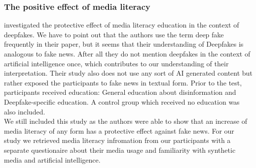 \documentclass[
  a4paper,  %
  twoside,  %
  bibliography=totoc,
  headsepline,
  cleardoublepage=empty,
  parskip=half,
  draft=false
]{scrbook}
\begin{document}
\subsubsection*{The positive effect of media literacy}
\citeauthor{hwangEffectsDisinformationUsing2021} investigated the protective effect of media literacy education in the context of deepfakes. We have to point out that the authors use the term deep fake frequently in their paper, but it seems that their understanding of Deepfakes is analogous to fake news. After all they do not mention deepfakes in the context of artificial intelligence once, which contributes to our understanding of their interpretation. Their study also does not use any sort of AI generated content but rather exposed the participants to fake news in textual form. Prior to the test, participants received education: General education about disinformation and Deepfake-specific education. A control group which received no education was also included. \\
We still included this study as the authors were able to show that an increase of media literacy of any form has a protective effect against fake news. For our study we retrieved media literacy infromation from our participants with a separate questionaire about their media usage and familiarity with synthetic media and artificial intelligence.
\end{document}
